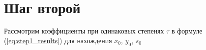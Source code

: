 \section{Шаг второй}

Рассмотрим коэффициенты при одинаковых степенях $ \tau $ в формуле (\ref{eq:step1_results}) для нахождения $ x_0 $, $ y_0 $, $ s_0 $